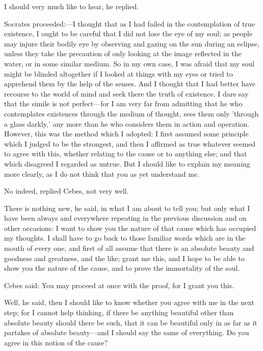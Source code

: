 \documentclass[11pt,letter]{article}
\begin{document}
\par  I should very much like to hear, he replied.

\par  Socrates proceeded:—I thought that as I had failed in the contemplation of true existence, I ought to be careful that I did not lose the eye of my soul; as people may injure their bodily eye by observing and gazing on the sun during an eclipse, unless they take the precaution of only looking at the image reflected in the water, or in some similar medium. So in my own case, I was afraid that my soul might be blinded altogether if I looked at things with my eyes or tried to apprehend them by the help of the senses. And I thought that I had better have recourse to the world of mind and seek there the truth of existence. I dare say that the simile is not perfect—for I am very far from admitting that he who contemplates existences through the medium of thought, sees them only 'through a glass darkly,' any more than he who considers them in action and operation. However, this was the method which I adopted: I first assumed some principle which I judged to be the strongest, and then I affirmed as true whatever seemed to agree with this, whether relating to the cause or to anything else; and that which disagreed I regarded as untrue. But I should like to explain my meaning more clearly, as I do not think that you as yet understand me.

\par  No indeed, replied Cebes, not very well.

\par  There is nothing new, he said, in what I am about to tell you; but only what I have been always and everywhere repeating in the previous discussion and on other occasions: I want to show you the nature of that cause which has occupied my thoughts. I shall have to go back to those familiar words which are in the mouth of every one, and first of all assume that there is an absolute beauty and goodness and greatness, and the like; grant me this, and I hope to be able to show you the nature of the cause, and to prove the immortality of the soul.

\par  Cebes said: You may proceed at once with the proof, for I grant you this.

\par  Well, he said, then I should like to know whether you agree with me in the next step; for I cannot help thinking, if there be anything beautiful other than absolute beauty should there be such, that it can be beautiful only in as far as it partakes of absolute beauty—and I should say the same of everything. Do you agree in this notion of the cause?
\end{document}

